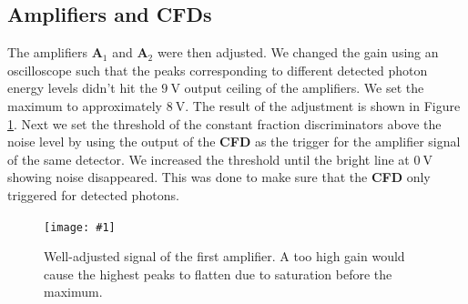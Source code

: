 \documentclass[twocolumn]{article}
\newcommand{\insertFigure}[1]{%
   \texttt{[image: \#1]}%
}
\begin{document}
\subsection{Amplifiers and CFDs}
The amplifiers \textbf{A$_1$} and \textbf{A$_2$} were then adjusted. We changed the gain using an oscilloscope such that the peaks corresponding to different detected photon energy levels didn't hit the $\SI{9}{\volt}$ output ceiling of the amplifiers. We set the maximum to approximately $\SI{8}{\volt}$. The result of the adjustment is shown in Figure \ref{fig:amp}. Next we set the threshold of the constant fraction discriminators above the noise level by using the output of the \textbf{CFD} as the trigger for the amplifier signal of the same detector. We increased the threshold until the bright line at $\SI{0}{\volt}$ showing noise disappeared. This was done to make sure that the \textbf{CFD} only triggered for detected photons.
\begin{figure}[!h]
	\centering
	\insertFigure{./screenshots/SC08_cropped.png}
	\caption{Well-adjusted signal of the first amplifier. A too high gain would cause the highest peaks to flatten due to saturation before the maximum.} 
	\label{fig:amp}
\end{figure}
\end{document}
